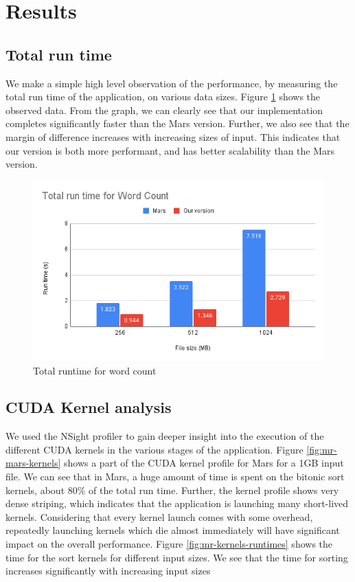 \documentclass{article}
\begin{document}
\section{Results}
\subsection{Total run time}
We make a simple high level observation of the performance, by measuring the total run time of the application, on various data sizes. Figure \ref{fig:mr-runtime} shows the observed data. From the graph, we can clearly see that our implementation completes significantly faster than the Mars version. Further, we also see that the margin of difference increases with increasing sizes of input. This indicates that our version is both more performant, and has better scalability than 
the Mars version.

\begin{figure}
    \centering
    \includegraphics[width=1\linewidth]{images/mr-runtime.png}
    \caption{Total runtime for word count}
    \label{fig:mr-runtime}
\end{figure}

\subsection{CUDA Kernel analysis}
We used the  NSight profiler to gain deeper insight into the execution of the different CUDA kernels in the various stages of the application. Figure \ref{fig:mr-mars-kernels} shows a part of the CUDA kernel profile for Mars for a 1GB input file. We can see that in Mars, a huge amount of time is spent on the bitonic sort kernels, about 80\% of the total run time. Further, the kernel profile shows very dense striping, which indicates that the application is launching many short-lived kernels. Considering that every kernel launch comes with some overhead, repeatedly launching kernels which die almost immediately will have significant impact on the overall performance.  Figure \ref{fig:mr-kernels-runtimes} shows the time for the sort kernels for different input sizes. We see that the time for sorting increases significantly with increasing input sizes
\end{document}
